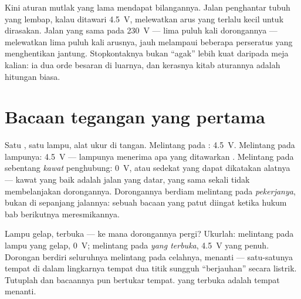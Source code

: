 \begin{remark}\label{rem:g8:voltage-voltmeter:mains}
Kini aturan mutlak yang lama mendapat bilangannya. Jalan penghantar
tubuh yang lembap, kalau ditawari \qty{4.5}{V}, melewatkan arus yang
terlalu kecil untuk dirasakan. Jalan yang sama pada \qty{230}{V} ---
lima puluh kali dorongannya --- melewatkan lima puluh kali arusnya,
jauh melampaui beberapa perseratus  yang menghentikan jantung.
Stopkontaknya bukan ``agak'' lebih kuat daripada meja  kalian:
ia dua orde besaran di luarnya, dan kerasnya kitab aturannya adalah
hitungan biasa.
\end{remark}

\section{Bacaan tegangan yang pertama}

\begin{example}\label{ex:g8:voltage-voltmeter:readings}
Satu , satu lampu, alat ukur di tangan. Melintang pada
: \qty{4.5}{V}. Melintang pada lampunya: \qty{4.5}{V} ---
lampunya menerima apa yang ditawarkan . Melintang pada
sebentang \emph{kawat} penghubung: \qty{0}{V}, atau sedekat yang dapat
dikatakan alatnya --- kawat yang baik adalah jalan yang datar, yang
sama sekali tidak membelanjakan dorongannya. Dorongannya berdiam
melintang pada \emph{pekerjanya}, bukan di sepanjang jalannya: sebuah
bacaan yang patut diingat ketika hukum bab berikutnya meresmikannya.
\end{example}

\begin{example}\label{ex:g8:voltage-voltmeter:openswitch}
Lampu gelap,  terbuka --- ke mana dorongannya pergi? Ukurlah:
melintang pada lampu yang gelap, \qty{0}{V}; melintang pada
\emph{ yang terbuka}, \qty{4.5}{V} yang penuh. Dorongan
 berdiri seluruhnya melintang pada celahnya, menanti ---
satu-satunya tempat di dalam lingkarnya tempat dua titik sungguh
``berjauhan'' secara listrik. Tutuplah  dan bacaannya pun
bertukar tempat.  yang terbuka adalah tempat 
menanti.
\end{example}

